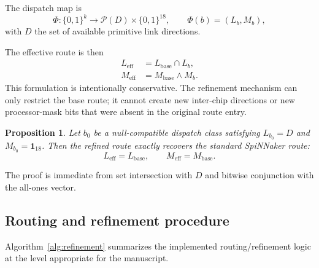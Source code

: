 \documentclass[11pt]{article}
\newtheorem{proposition}{Proposition}
\begin{document}
The dispatch map is
\[
    \Phi : \{0,1\}^k \to \mathcal{P}(D) \times \{0,1\}^{18}, \qquad \Phi(b) = (L_b, M_b),
\]
with $D$ the set of available primitive link directions.

The effective route is then
\begin{align}
    L_{\mathrm{eff}} &= L_{\mathrm{base}} \cap L_b, \\
    M_{\mathrm{eff}} &= M_{\mathrm{base}} \wedge M_b.
\end{align}
This formulation is intentionally conservative. The refinement mechanism can only restrict the base route; it cannot create new inter-chip directions or new processor-mask bits that were absent in the original route entry.

\begin{proposition}
Let $b_0$ be a null-compatible dispatch class satisfying $L_{b_0}=D$ and $M_{b_0}=\mathbf{1}_{18}$. Then the refined route exactly recovers the standard SpiNNaker route:
\[
L_{\mathrm{eff}}=L_{\mathrm{base}}, \qquad M_{\mathrm{eff}}=M_{\mathrm{base}}.
\]
\end{proposition}

\noindent The proof is immediate from set intersection with $D$ and bitwise conjunction with the all-ones vector.

\subsection{Routing and refinement procedure}
Algorithm~\ref{alg:refinement} summarizes the implemented routing/refinement logic at the level appropriate for the manuscript.
\end{document}
